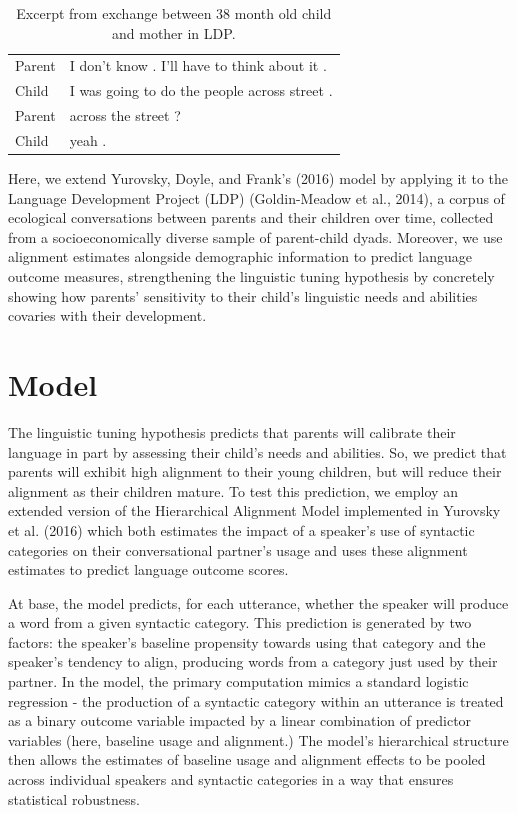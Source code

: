 \documentclass[10pt, letterpaper]{article}
\begin{document}
\begin{table}[H]
\centering
\begin{tabular}{ll}
  \hline
  \hline
Parent & I don't know . I'll have to think about it . \\ 
  Child & I was going to do the people across street . \\ 
  Parent & across the street ? \\ 
  Child & yeah . \\ 
   \hline
\end{tabular}
\caption{Excerpt from exchange between 38 month old child and mother in LDP.} 
\end{table}

Here, we extend Yurovsky, Doyle, and Frank's (2016) model by applying it
to the Language Development Project (LDP) (Goldin-Meadow et al., 2014),
a corpus of ecological conversations between parents and their children
over time, collected from a socioeconomically diverse sample of
parent-child dyads. Moreover, we use alignment estimates alongside
demographic information to predict language outcome measures,
strengthening the linguistic tuning hypothesis by concretely showing how
parents' sensitivity to their child's linguistic needs and abilities
covaries with their development.

\hypertarget{model}{%
\section{Model}\label{model}}

The linguistic tuning hypothesis predicts that parents will calibrate
their language in part by assessing their child's needs and abilities.
So, we predict that parents will exhibit high alignment to their young
children, but will reduce their alignment as their children mature. To
test this prediction, we employ an extended version of the Hierarchical
Alignment Model implemented in Yurovsky et al. (2016) which both
estimates the impact of a speaker's use of syntactic categories on their
conversational partner's usage and uses these alignment estimates to
predict language outcome scores.

At base, the model predicts, for each utterance, whether the speaker
will produce a word from a given syntactic category. This prediction is
generated by two factors: the speaker's baseline propensity towards
using that category and the speaker's tendency to align, producing words
from a category just used by their partner. In the model, the primary
computation mimics a standard logistic regression - the production of a
syntactic category within an utterance is treated as a binary outcome
variable impacted by a linear combination of predictor variables (here,
baseline usage and alignment.) The model's hierarchical structure then
allows the estimates of baseline usage and alignment effects to be
pooled across individual speakers and syntactic categories in a way that
ensures statistical robustness.
\end{document}
